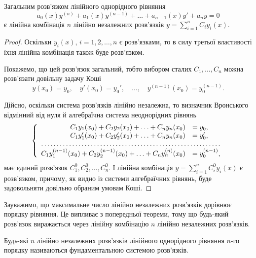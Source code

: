 \begin{theorem}
	Загальним розв'язком лінійного однорідного рівняння
	\begin{equation*}
		a_0(x) y^{(n)} + a_1(x) y^{(n-1)} + \ldots + a_{n-1}(x) y' + a_n y = 0
	\end{equation*}
 	є лінійна комбінація $n$ лінійно незалежних розв'язків $y = \sum_{i = 1}^n C_i y_i(x)$.
\end{theorem}

\begin{proof}
	Оскільки $y_i(x)$, $i = 1, 2, \ldots, n$ є розв'язками, то в силу третьої властивості їхня лінійна комбінація також буде розв'язком. \parvskip

	Покажемо, що цей розв'язок загальний, тобто вибором сталих $C_1, \ldots, C_n$ можна розв'язати довільну задачу Коші
	\begin{equation*}
		y(x_0) = y_0, \quad y'(x_0) = y_0', \quad \ldots, \quad y^{(n - 1)}(x_0) = y_0^{(n - 1)}.
	\end{equation*}

	Дійсно, оскільки система розв'язків лінійно незалежна, то визначник Вронського відмінний від нуля й алгебраїчна система неоднорідних рівнянь
	\begin{equation*}
		\left\{ \begin{array}{rl}
			C_1 y_1(x_0) + C_2 y_2(x_0) + \ldots + C_n y_n(x_0) &= y_0, \\
			C_1 y_1'(x_0) + C_2 y_2'(x_0) + \ldots + C_n y_n(x_0) &= y_0', \\
			\hdotsfor{2} \\
			C_1 y_1^{(n - 1)}(x_0) + C_2 y_2^{(n - 1)}(x_0) + \ldots + C_n y_n^{(n)}(x_0) &= y_0^{(n - 1)},
		\end{array} \right.
	\end{equation*}
	має єдиний розв'язок $C_1^0, C_2^0, \ldots, C_n^0$. І лінійна комбінація $y = \sum_{i = 1}^n C_i^0 y_i(x)$ є розв'язком, причому, як видно із системи алгебраїчних рівнянь, буде задовольняти довільно обраним умовам Коші.
\end{proof}

Зауважимо, що максимальне число лінійно незалежних розв'язків дорівнює порядку рівняння. Це випливає з попередньої теореми, тому що будь-який розв'язок виражається через лінійну комбінацію $n$ лінійно незалежних розв'язків.

\begin{definition}
	Будь-які $n$ лінійно незалежних розв'язків лінійного однорідного рівняння $n$-го порядку називаються фундаментальною системою розв'язків.
\end{definition}